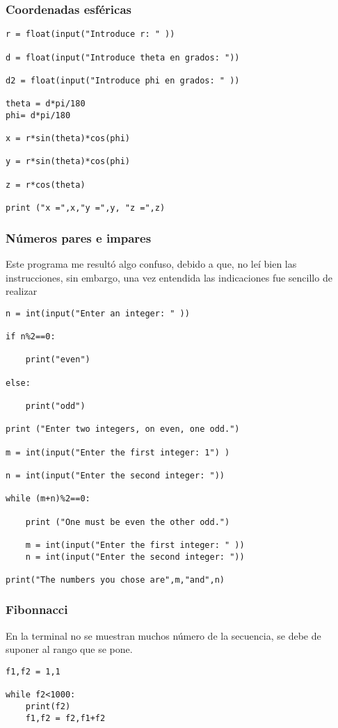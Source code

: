 \documentclass[12pt]{article}
\begin{document}
\subsubsection*{Coordenadas esféricas}
\begin{verbatim}
r = float(input("Introduce r: " ))

d = float(input("Introduce theta en grados: "))

d2 = float(input("Introduce phi en grados: " ))

theta = d*pi/180 
phi= d*pi/180 

x = r*sin(theta)*cos(phi)

y = r*sin(theta)*cos(phi)

z = r*cos(theta)

print ("x =",x,"y =",y, "z =",z)
\end{verbatim}

\subsubsection*{Números pares e impares}

Este programa me resultó algo confuso, debido a que, no leí bien las instrucciones, sin embargo, una vez entendida las indicaciones fue sencillo de realizar
\begin{verbatim}
n = int(input("Enter an integer: " ))

if n%2==0:
    
    print("even")
    
else:
    
    print("odd")

print ("Enter two integers, on even, one odd.")

m = int(input("Enter the first integer: 1") )

n = int(input("Enter the second integer: "))
    
while (m+n)%2==0:
    
    print ("One must be even the other odd.")
    
    m = int(input("Enter the first integer: " ))
    n = int(input("Enter the second integer: "))
    
print("The numbers you chose are",m,"and",n)
\end{verbatim}

\subsubsection*{Fibonnacci}

En la terminal no se muestran muchos número de la secuencia, se debe de suponer al rango que se pone.

\begin{verbatim}
f1,f2 = 1,1

while f2<1000:
    print(f2)
    f1,f2 = f2,f1+f2
\end{verbatim}
 
\end{document}

